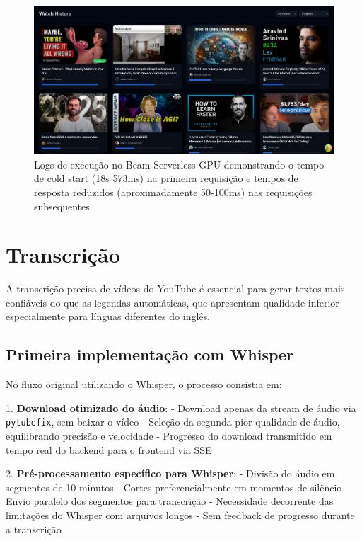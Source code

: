 \documentclass[tcc,capa]{texufpel}
\begin{document}
\begin{figure}[H]
  \centering
  \includegraphics[width=\textwidth,height=0.45\textheight,keepaspectratio]{exemplo-slides/graphics/images/watch history.png}
  \caption{Logs de execução no Beam Serverless GPU demonstrando o tempo de cold start (18s 573ms) na primeira requisição e tempos de resposta reduzidos (aproximadamente 50-100ms) nas requisições subsequentes}
  \label{fig:Average_encryption_throughput}
\end{figure}




\section{Transcrição}

A transcrição precisa de vídeos do YouTube é essencial para gerar textos mais confiáveis do que as legendas automáticas, que apresentam qualidade inferior especialmente para línguas diferentes do inglês.

\subsection{Primeira implementação com Whisper}

No fluxo original utilizando o Whisper, o processo consistia em:

1. \textbf{Download otimizado do áudio}:
   - Download apenas da stream de áudio via \texttt{pytubefix}, sem baixar o vídeo
   - Seleção da segunda pior qualidade de áudio, equilibrando precisão e velocidade
   - Progresso do download transmitido em tempo real do backend para o frontend via SSE

2. \textbf{Pré-processamento específico para Whisper}:
   - Divisão do áudio em segmentos de 10 minutos
   - Cortes preferencialmente em momentos de silêncio
   - Envio paralelo dos segmentos para transcrição
   - Necessidade decorrente das limitações do Whisper com arquivos longos
   - Sem feedback de progresso durante a transcrição
\end{document}
